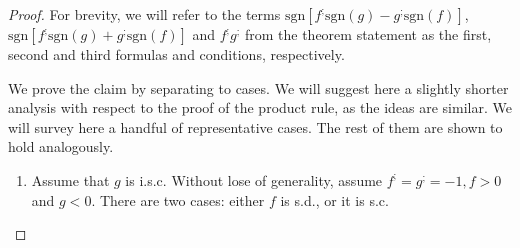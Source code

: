 \documentclass[11pt]{book}
\begin{document}
\begin{proof}For brevity, we will refer to the terms $\text{sgn}\left[f^{;}\text{sgn}\left(g\right)-g^{;}\text{sgn}\left(f\right)\right]$, $\text{sgn}\left[f^{;}\text{sgn}\left(g\right)+g^{;}\text{sgn}\left(f\right)\right]$ and $f^{;}g^{;}$ from the theorem statement as the first, second and third formulas and conditions, respectively.

We prove the claim by separating to cases. We will suggest here a slightly shorter analysis with respect to the proof of the product rule, as the ideas are similar. We will survey here a handful of representative cases. The rest of them are shown to hold analogously.

\begin{enumerate}

\item Assume that $g$ is i.s.c. Without lose of generality, assume $f^{;}=g^{;}=-1,f>0$ and $g<0$. There are two cases: either $f$ is s.d., or it is s.c.
\begin{itemize}


\end{itemize}
\end{enumerate}
\end{proof}
\end{document}
